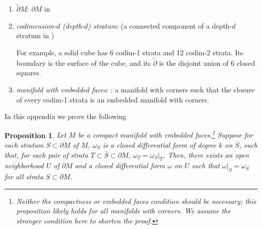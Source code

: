 \documentclass[11pt]{article}
\newtheorem{prp}[thm]{Proposition}
\theoremstyle{definition}
\newtheorem{dfn}[thm]{Definition}
\theoremstyle{remark}
\def\ov#1{\overline{#1}}
\def\Z{\mathbb{Z}}
\def\R{\mathbb{R}}
\begin{document}
\begin{appendices}
\begin{enumerate}[label=$\cdot$]
\item $\tilde\partial M$: $\partial M$ in \cite[Definition 2.6]{Joyce}

\item {\it codimension-$d$ (depth-$d$) stratum}: \cite[Definition 7]{Hajek} (a connected component of a depth-$d$ stratum in \cite[Definition 2.3]{Joyce})

For example, a solid cube has 6 codim-1 strata and 12 codim-2 strata. Its boundary is the surface of the cube, and its $\tilde\partial$ is the disjoint union of 6 closed squares. 

\item {\it manifold with embedded faces}: \cite[Definition 18]{Hajek}: a manifold with corners such that the closure of every codim-1 strata is an embedded manifold with corners. 
\end{enumerate}



In this appendix we prove the following 
\begin{prp}\label{formextension_prp}
Let $M$ be a compact manifold with embedded faces.\footnote{Neither the compactness or embedded faces condition should be necessary; this proposition likely holds for all manifolds with corners. We assume the stronger condition here to shorten the proof.} 
Suppose for each stratum $S\subset\partial M$ of $M$, $\omega_S$ is a closed differential form of degree $k$ on $\ov{S}$, such that, for each pair of strata $T\subset \ov{S} \subset\partial{M}$, $\omega_T=\omega_S|_{\ov{T}}$. 
Then, there exists an open neighborhood $U$ of $\partial M$ and a closed differential form $\omega$ on $U$ such that $\omega|_{\ov{S}}=\omega_S$ for all strata $S\subset\partial M$. 
\end{prp}


\end{appendices}
\end{document}
